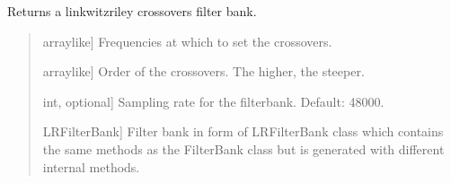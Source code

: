 \documentclass[letterpaper,10pt,english]{sphinxmanual}
\begin{document}
\begin{fulllineitems}
\label{\detokenize{modules/dsptoolbox.filterbanks:dsptoolbox.filterbanks.linkwitz_riley_crossovers}}
\pysigstartsignatures
{}
\pysigstopsignatures
\sphinxAtStartPar
Returns a linkwitz\sphinxhyphen{}riley crossovers filter bank.
\begin{quote}\begin{description}
\begin{description}
\sphinxlineitem{\sphinxstylestrong{freqs}}{[}array\sphinxhyphen{}like{]}
\sphinxAtStartPar
Frequencies at which to set the crossovers.

\sphinxlineitem{\sphinxstylestrong{order}}{[}array\sphinxhyphen{}like{]}
\sphinxAtStartPar
Order of the crossovers. The higher, the steeper.

\sphinxlineitem{\sphinxstylestrong{sampling\_rate\_hz}}{[}int, optional{]}
\sphinxAtStartPar
Sampling rate for the filterbank. Default: 48000.

\end{description}

\begin{description}
\sphinxlineitem{\sphinxstylestrong{fb}}{[}LRFilterBank{]}
\sphinxAtStartPar
Filter bank in form of LRFilterBank class which contains the same
methods as the FilterBank class but is generated with different
internal methods.

\end{description}

\end{description}\end{quote}

\end{fulllineitems}

\end{document}
